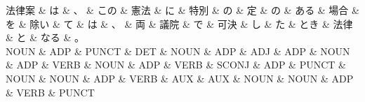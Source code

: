 \documentclass[tikz,border=5pt]{standalone}
\begin{document}
\normalsize
\begin{dependency}[edge unit distance=9.6pt]
    \begin{deptext}[column sep=1em]
        法律案 \& は \& 、 \& この \& 憲法 \& に \& 特別 \& の \& 定 \& の \& ある \& 場合 \& を \& 除い \& て \& は \& 、 \& 両 \& 議院 \& で \& 可決 \& し \& た \& とき \& 法律 \& と \& なる \& 。\\
        NOUN \& ADP \& PUNCT \& DET \& NOUN \& ADP \& ADJ \& ADP \& NOUN \& ADP \& VERB \& NOUN \& ADP \& VERB \& SCONJ \& ADP \& PUNCT \& NOUN \& NOUN \& ADP \& VERB \& AUX \& AUX \& NOUN \& NOUN \& ADP \& VERB \& PUNCT\\
    \end{deptext}
\end{dependency}
\end{document}

